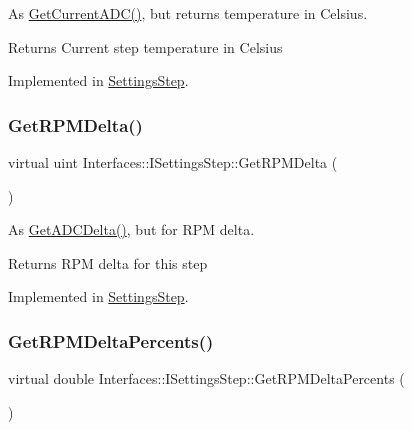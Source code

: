 As \hyperlink{class_interfaces_1_1_i_settings_step_a54d5ce3350791e080bcb75d472376abf}{Get\+Current\+A\+D\+C()}, but returns temperature in Celsius. 

\begin{DoxyReturn}{Returns}
Current step temperature in Celsius 
\end{DoxyReturn}


Implemented in \hyperlink{class_settings_step_a78ec872aa61713e3df36e93f56804afe}{Settings\+Step}.

\mbox{\label{class_interfaces_1_1_i_settings_step_ace758dafae2a6bcbb0b1a3a64c802e3c}} 
\subsubsection{\texorpdfstring{Get\+R\+P\+M\+Delta()}{GetRPMDelta()}}
{\footnotesize\ttfamily virtual uint Interfaces\+::\+I\+Settings\+Step\+::\+Get\+R\+P\+M\+Delta (\begin{DoxyParamCaption}{ }\end{DoxyParamCaption})\hspace{0.3cm}{\ttfamily [pure virtual]}}



As \hyperlink{class_interfaces_1_1_i_settings_step_ab77c6eaa45707ec4932a8f432b13ad78}{Get\+A\+D\+C\+Delta()}, but for R\+PM delta. 

\begin{DoxyReturn}{Returns}
R\+PM delta for this step 
\end{DoxyReturn}


Implemented in \hyperlink{class_settings_step_a594ce71fb0626c79c3e4d4f988e484af}{Settings\+Step}.

\mbox{\label{class_interfaces_1_1_i_settings_step_a9db8c7569c5dc35b8541dc6e4d202df1}} 
\subsubsection{\texorpdfstring{Get\+R\+P\+M\+Delta\+Percents()}{GetRPMDeltaPercents()}}
{\footnotesize\ttfamily virtual double Interfaces\+::\+I\+Settings\+Step\+::\+Get\+R\+P\+M\+Delta\+Percents (\begin{DoxyParamCaption}{ }\end{DoxyParamCaption})\hspace{0.3cm}{\ttfamily [pure virtual]}}



